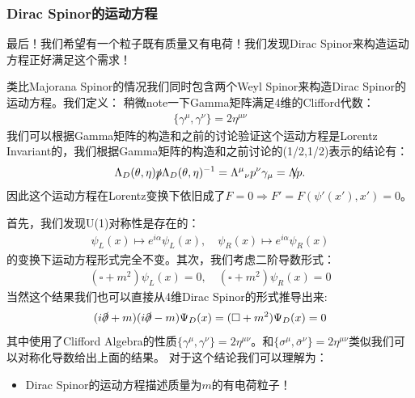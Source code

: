 \subsubsection{Dirac Spinor的运动方程}
最后！我们希望有一个粒子既有质量又有电荷！我们发现Dirac Spinor来构造运动方程正好满足这个需求！

\bigskip
{}

类比Majorana Spinor的情况我们同时包含两个Weyl Spinor来构造Dirac Spinor的运动方程。我们定义：
稍微note一下Gamma矩阵满足4维的Clifford代数：
\begin{align}
  \{\gamma^\mu,\gamma^\nu\}=2\eta^{\mu\nu}
\end{align}
我们可以根据Gamma矩阵的构造和之前的讨论验证这个运动方程是Lorentz
Invariant的，我们根据Gamma矩阵的构造和之前讨论的(1/2,1/2)表示的结论有：
\begin{align}
  \Lambda_D(\theta,\eta)\slashed{p}\Lambda_D(\theta,\eta)^{-1}=\Lambda^\mu{}_\nu
  p^\nu\gamma_\mu=\slashed{\Lambda p}.
\end{align}
因此这个运动方程在Lorentz变换下依旧成了$ F = 0 \Rightarrow F' = F(\psi'(x'),x') = 0 $。


首先，我们发现U(1)对称性是存在的：
\begin{align}
  \psi_L(x)\mapsto e^{i\alpha}\psi_L(x), \quad \psi_R(x)\mapsto
  e^{i\alpha}\psi_R(x)
\end{align}
的变换下运动方程形式完全不变。其次，我们考虑二阶导数形式：
\begin{align}
  (\square + m^2)\psi_L(x)=0, \quad (\square + m^2)\psi_R(x)=0
\end{align}
当然这个结果我们也可以直接从4维Dirac Spinor的形式推导出来:
\begin{align}
  (i\slashed{\partial}+m)(i\slashed{\partial}-m)\Psi_D(x)=(\square + m^2)\Psi_D(x)=0
\end{align}
其中使用了Clifford Algebra的性质$ \{\gamma^\mu,\gamma^\nu\}=2\eta^{\mu\nu}
$。和$ \{\sigma^\mu,\bar{\sigma}^\nu\}=2\eta^{\mu\nu} $类似我们可以对称化导数给出上面的结果。
对于这个结论我们可以理解为：
\begin{itemize}
  \item Dirac Spinor的运动方程描述质量为$ m $的有电荷粒子！
\end{itemize}
\bigskip

